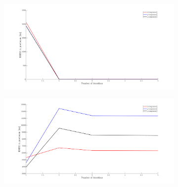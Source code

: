 \begin{figure}[H]
    \begin{subfigure}[b]{0.5\linewidth}
      \includegraphics[scale=0.3]{Figures/RMSEvsIterations-50km-1obs.png}
      \caption{}
    \end{subfigure}
    \begin{subfigure}[b]{0.5\linewidth}
      \includegraphics[scale=0.3]{Figures/RMSEvsIterations-250km-1obs.png}
      \caption{}
    \end{subfigure}
    \caption{}
  \label{fig: RMSE-1obs}
  \end{figure}